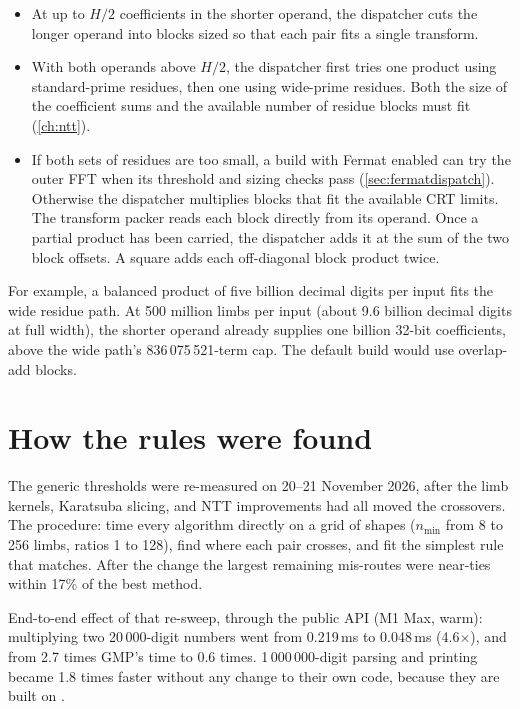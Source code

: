 \begin{itemize}
  \item At up to $H/2$ coefficients in the shorter operand, the dispatcher
        cuts the longer operand into blocks sized so that each pair fits
        a single transform.
  \item With both operands above $H/2$, the dispatcher first tries one
        product using standard-prime residues, then one using wide-prime
        residues. Both the size of the coefficient sums and the available
        number of residue blocks must fit (\cref{ch:ntt}).
  \item If both sets of residues are too small, a build with Fermat enabled
        can try the outer FFT when its threshold and sizing checks pass
        (\cref{sec:fermatdispatch}). Otherwise the dispatcher multiplies
        blocks that fit the available CRT limits. The transform packer
        reads each block directly from its operand. Once a partial
        product has been carried, the dispatcher adds it at the sum
        of the two block offsets. A square adds each off-diagonal
        block product twice.
\end{itemize}

For example, a balanced product of five billion decimal digits per input
fits the wide residue path. At 500 million limbs per input (about
9.6 billion decimal digits at full width), the shorter operand already
supplies one billion 32-bit coefficients, above the wide path's
836\,075\,521-term cap. The default build would use overlap-add blocks.

\section{How the rules were found}

The generic thresholds were re-measured on 20--21 November 2026, after the limb kernels,
Karatsuba slicing, and NTT improvements had all moved the crossovers. The procedure:
time every algorithm directly on a grid of shapes ($n_{\min}$ from 8 to 256 limbs,
ratios 1 to 128), find where each pair crosses, and fit the simplest rule that matches.
After the change the largest remaining mis-routes were near-ties within 17\% of the best
method.

\begin{perfnote}
End-to-end effect of that re-sweep, through the public API (M1 Max, warm):
multiplying two 20\,000-digit numbers went from 0.219\,ms to 0.048\,ms (4.6$\times$), and
from 2.7 times GMP's time to 0.6 times. 1\,000\,000-digit parsing and printing became
1.8 times faster without any change to their own code, because they are built on
.
\end{perfnote}
